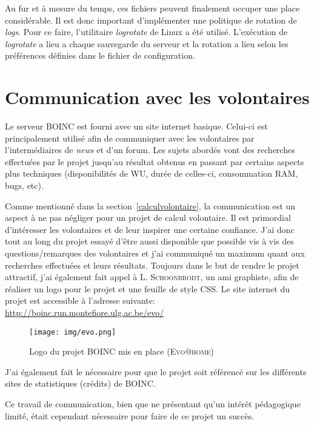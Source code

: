\documentclass[a4paper, 11pt]{report}
\begin{document}
Au fur et à mesure du temps, ces fichiers peuvent finalement occuper une place considérable. Il est donc important d'implémenter une politique de rotation de \textit{logs}. Pour ce faire, l'utilitaire \textit{logrotate} de Linux a été utilisé. L'exécution de \textit{logrotate} a lieu a chaque sauvegarde du serveur et la rotation a lieu selon les préférences définies dans le fichier de configuration. %

\section{Communication avec les volontaires}
Le serveur \textsc{BOINC} est fourni avec un site internet basique. Celui-ci est principalement utilisé afin de communiquer avec les volontaires par l'intermédiaires de \textit{news} et d'un forum. Les sujets abordés vont des recherches effectuées par le projet jusqu'au résultat obtenus en passant par certains aspects plus techniques (disponibilités de WU, durée de celles-ci, consommation RAM, bugs, etc).

Comme mentionné dans la section~\ref{calculvolontaire}, la communication est un aspect à ne pas négliger pour un projet de calcul volontaire. Il est primordial d'intéresser les volontaires et de leur inspirer une certaine confiance. J'ai donc tout au long du projet essayé d'être aussi disponible que possible vis à vis des questions/remarques des volontaires et j'ai communiqué un maximum quant aux recherches effectuées et leurs résultats.
Toujours dans le but de rendre le projet attractif, j'ai également fait appel à L. \textsc{Schoonbrodt}, un ami graphiste, afin de réaliser un logo pour le projet et une feuille de style CSS. Le site internet du projet est accessible à l'adresse suivante: \url{http://boinc.run.montefiore.ulg.ac.be/evo/}

\begin{figure}[!h]
\centering
\texttt{[image: img/evo.png]}
\caption{Logo du projet \textsc{BOINC} mis en place (\textsc{Evo@home})}
\label{evologo}
\end{figure}

J'ai également fait le nécessaire pour que le projet soit référencé sur les différents sites de statistiques (crédits) de \textsc{BOINC}.

Ce travail de communication, bien que ne présentant qu'un intérêt pédagogique limité, était cependant nécessaire pour faire de ce projet un succès.
\end{document}

